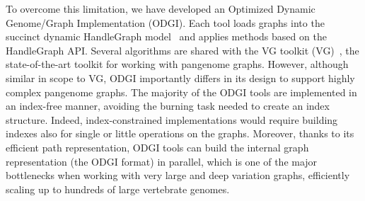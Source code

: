 \documentclass{bioinfo}
\begin{document}
    To overcome this limitation, we have developed an Optimized Dynamic Genome/Graph Implementation (ODGI). Each tool
    loads graphs into the succinct dynamic HandleGraph model~\citep{33040146} and applies methods based on the
    HandleGraph API. Several algorithms are shared with the VG toolkit (VG)~\citep{30125266}, the state-of-the-art
    toolkit for working with pangenome graphs. However, although similar in scope to VG, ODGI importantly differs in
    its design to support highly complex pangenome graphs. The majority of the ODGI tools are implemented in an
    index-free manner, avoiding the burning task needed to create an index structure. Indeed, index-constrained
    implementations would require building indexes also for single or little operations on the graphs. Moreover,
    thanks to its efficient path representation, ODGI tools can build the internal graph representation (the ODGI
    format) in parallel, which is one of the major bottlenecks when working with very large and deep variation graphs,
    efficiently scaling up to hundreds of large vertebrate genomes.

\end{document}
